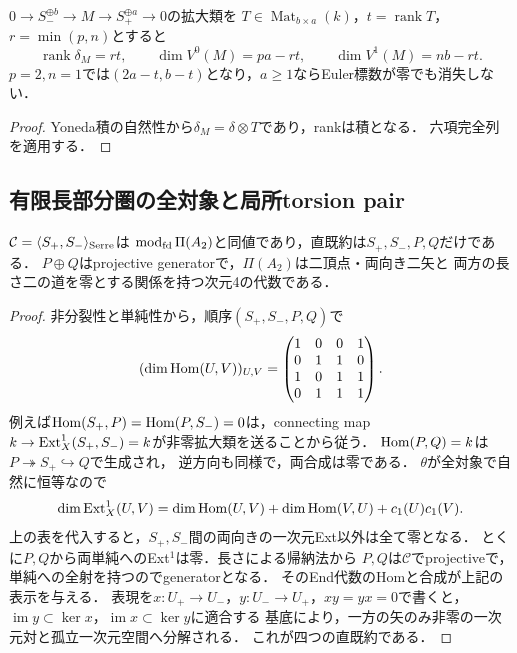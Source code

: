 \begin{corollary}[二段直和拡大]
\label{cor:a2-rank-matrix-exact}
$0\to S_-^{\oplus b}\to M\to S_+^{\oplus a}\to0$の拡大類を
$T\in\operatorname{Mat}_{b\times a}(k)$，$t=\operatorname{rank}T$，$r=\min(p,n)$とすると
\[
\operatorname{rank}\delta_M=rt,\qquad
\dim V^0(M)=pa-rt,\qquad\dim V^1(M)=nb-rt.
\]
$p=2,n=1$では$(2a-t,b-t)$となり，$a\ge1$ならEuler標数が零でも消失しない．
\end{corollary}
\begin{proof}
Yoneda積の自然性から$\delta_M=\delta\otimes T$であり，rankは積となる．
六項完全列を適用する．
\end{proof}

\subsection{有限長部分圏の全対象と局所torsion pair}
\begin{theorem}[四つの直既約対象]
\label{thm:a2-serre-category}
$\mathcal C=\langle S_+,S_-\rangle_{\rm Serre}$は
$\operatorname{mod}_{\rm fd}\Pi(A_2)$と同値であり，直既約は$S_+,S_-,P,Q$だけである．
$P\oplus Q$はprojective generatorで，$\Pi(A_2)$は二頂点・両向き二矢と
両方の長さ二の道を零とする関係を持つ次元4の代数である．
\end{theorem}
\begin{proof}
非分裂性と単純性から，順序$(S_+,S_-,P,Q)$で
\[
(\dim\operatorname{Hom}(U,V))_{U,V}=
\begin{pmatrix}1&0&0&1\\0&1&1&0\\1&0&1&1\\0&1&1&1\end{pmatrix}.
\]
例えば$\operatorname{Hom}(S_+,P)=\operatorname{Hom}(P,S_-)=0$は，connecting map
$k\to\operatorname{Ext}_X^1(S_+,S_-)=k$が非零拡大類を送ることから従う．
$\operatorname{Hom}(P,Q)=k$は$P\twoheadrightarrow S_+\hookrightarrow Q$で生成され，
逆方向も同様で，両合成は零である．
$\theta$が全対象で自然に恒等なので
\[
\dim\operatorname{Ext}_X^1(U,V)=\dim\operatorname{Hom}(U,V)+\dim\operatorname{Hom}(V,U)+c_1(U)c_1(V).
\]
上の表を代入すると，$S_+,S_-$間の両向きの一次元Ext以外は全て零となる．
とくに$P,Q$から両単純へのExt$^1$は零．長さによる帰納法から
$P,Q$は$\mathcal C$でprojectiveで，単純への全射を持つのでgeneratorとなる．
そのEnd代数のHomと合成が上記の表示を与える．
表現を$x:U_+\to U_-$，$y:U_-\to U_+$，$xy=yx=0$で書くと，
$\operatorname{im}y\subset\ker x$，$\operatorname{im}x\subset\ker y$に適合する
基底により，一方の矢のみ非零の一次元対と孤立一次元空間へ分解される．
これが四つの直既約である．
\end{proof}

